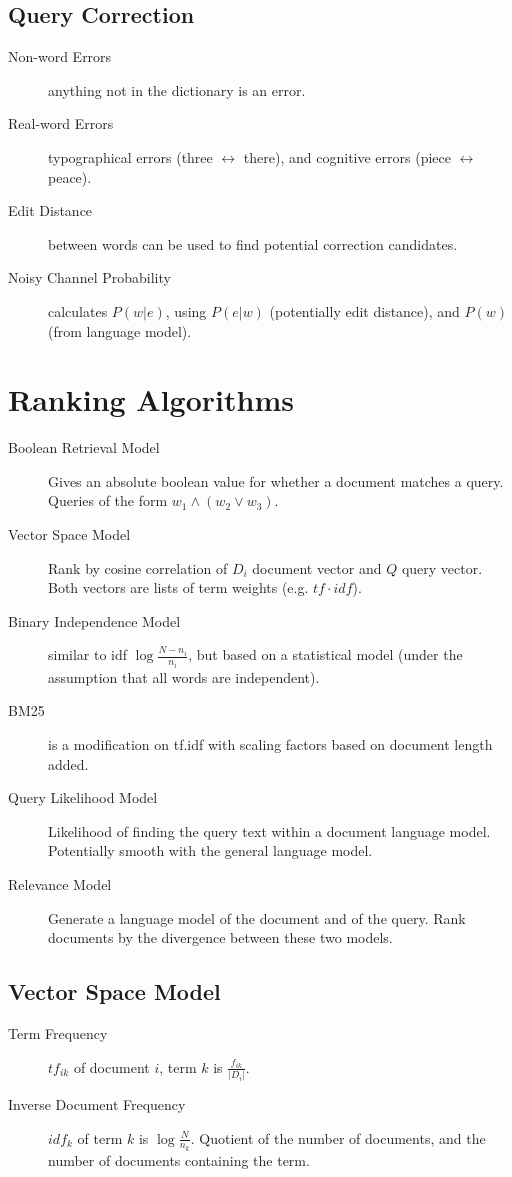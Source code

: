 \documentclass[landscape]{cheat}
\begin{document}
\begin{multicols*}{3}
\subsection{Query Correction}
\begin{description}
    \item[Non-word Errors] anything not in the dictionary is an error.
    \item[Real-word Errors] typographical errors (three $\leftrightarrow$ there), and cognitive errors (piece $\leftrightarrow$ peace).
    \item[Edit Distance] between words can be used to find potential correction candidates.
    \item[Noisy Channel Probability] calculates $P(w|e)$, using $P(e|w)$ (potentially edit distance), and $P(w)$ (from language model).
\end{description}

\section{Ranking Algorithms}
\begin{description}
    \item[Boolean Retrieval Model] Gives an absolute boolean value for whether a document matches a query.
        Queries of the form $w_1 \land (w_2 \lor w_3)$.
    \item[Vector Space Model] Rank by cosine correlation of $D_i$ document vector and $Q$ query vector.
        Both vectors are lists of term weights (e.g. $tf\cdot idf$).
    \item[Binary Independence Model] similar to idf $\log \frac {N-n_i} {n_i}$, but based on a statistical model (under the assumption that all words are independent).
    \item[BM25] is a modification on tf.idf with scaling factors based on document length added.
    \item[Query Likelihood Model] Likelihood of finding the query text within a document language model.
        Potentially smooth with the general language model.
    \item[Relevance Model] Generate a language model of the document and of the query.
        Rank documents by the divergence between these two models.
\end{description}

\subsection{Vector Space Model}
\begin{description}
    \item[Term Frequency] $tf_{ik}$ of document $i$, term $k$ is $\frac{f_{ik}}{|{D_i}|}$.
    \item[Inverse Document Frequency] $idf_k$ of term $k$ is $\log \frac N {n_k}$.
        Quotient of the number of documents, and the number of documents containing the term.
\end{description}


\end{multicols*}
\end{document}
